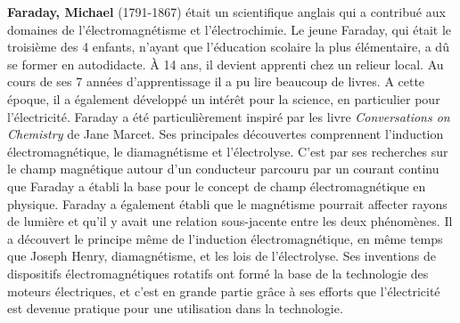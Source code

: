 {}
\label{sec:F}

\textbf{Faraday, Michael} (1791-1867) était un scientifique anglais qui a contribué aux domaines de l'électromagnétisme et l'électrochimie. Le jeune Faraday, qui était le troisième des 4 enfants, n'ayant que l'éducation scolaire la plus élémentaire, a dû se former en autodidacte. À 14 ans, il devient apprenti chez un relieur local. Au cours de ses 7 années d'apprentissage il a pu lire beaucoup de livres. A cette époque, il a également développé un intérêt pour la science, en particulier pour l'électricité. Faraday a été particulièrement inspiré par les livre \textit{Conversations on Chemistry} de Jane Marcet. Ses principales découvertes comprennent l'induction électromagnétique, le diamagnétisme et l'électrolyse. C'est par ses recherches sur le champ magnétique autour d'un conducteur parcouru par un courant continu que Faraday a établi la base pour le concept de champ électromagnétique en physique. Faraday a également établi que le magnétisme pourrait affecter rayons de lumière et qu'il y avait une relation sous-jacente entre les deux phénomènes. Il a découvert le principe même de l'induction électromagnétique, en même temps que Joseph Henry, diamagnétisme, et les lois de l'électrolyse. Ses inventions de dispositifs électromagnétiques rotatifs ont formé la base de la technologie des moteurs électriques, et c'est en grande partie grâce à ses efforts que l'électricité est devenue pratique pour une utilisation dans la technologie.

